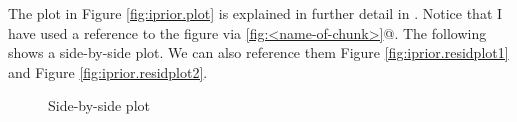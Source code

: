 \documentclass[english, 11pt]{article}\usepackage[]{graphicx}\usepackage[]{color}
\newenvironment{knitrout}{}{} %
\begin{document}
The plot in Figure \ref{fig:iprior.plot} is explained in further detail in \cite{jamil2017}. Notice that I have used a reference to the figure via \verb@\ref{fig:<name-of-chunk>}@. The following shows a side-by-side plot. We can also reference them Figure \ref{fig:iprior.residplot1} and Figure \ref{fig:iprior.residplot2}.

\begin{knitrout}
\color{fgcolor}\begin{figure}
\caption[Side-by-side plot]{Side-by-side plot}\label{fig:iprior.residplot}
\end{figure}


\end{knitrout}




\end{document}
